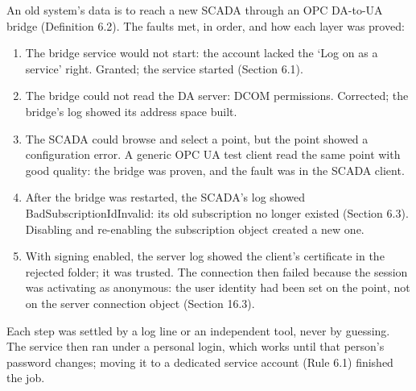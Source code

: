  An old system's data is to reach a new SCADA through an OPC DA-to-UA bridge (Definition 6.2). The faults met, in order, and how each layer was proved:
\begin{enumerate}
\item The bridge service would not start: the account lacked the ‘Log on as a service’ right. Granted; the service started (Section 6.1).
\item The bridge could not read the DA server: DCOM permissions. Corrected; the bridge's log showed its address space built.
\item The SCADA could browse and select a point, but the point showed a configuration error. A generic OPC UA test client read the same point with good quality: the bridge was proven, and the fault was in the SCADA client.
\item After the bridge was restarted, the SCADA's log showed BadSubscriptionIdInvalid: its old subscription no longer existed (Section 6.3). Disabling and re-enabling the subscription object created a new one.
\item With signing enabled, the server log showed the client's certificate in the rejected folder; it was trusted. The connection then failed because the session was activating as anonymous: the user identity had been set on the point, not on the server connection object (Section 16.3).
\end{enumerate}
Each step was settled by a log line or an independent tool, never by guessing. The service then ran under a personal login, which works until that person's password changes; moving it to a dedicated service account (Rule 6.1) finished the job.

